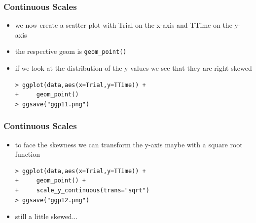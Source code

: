 \documentclass[xcolor={table},c]{beamer}
\begin{document}
\begin{frame}[fragile]\frametitle{Continuous Scales}
  \begin{itemize}
  \item we now create a scatter plot with Trial on the x-axis and TTime on the y-axis
  \item the respective geom is \texttt{geom\_point()}
  \item if we look at the distribution of the y values we see that they are right skewed
\begin{verbatim}
> ggplot(data,aes(x=Trial,y=TTime)) +
+     geom_point()
> ggsave("ggp11.png")
\end{verbatim}
  \end{itemize}
\begin{center}
\end{center}
\end{frame}


\begin{frame}[fragile]\frametitle{Continuous Scales}
  \begin{itemize}
  \item to face the skewness we can transform the y-axis maybe with a square root function
\begin{verbatim}
> ggplot(data,aes(x=Trial,y=TTime)) +
+     geom_point() +
+     scale_y_continuous(trans="sqrt")
> ggsave("ggp12.png")
\end{verbatim}
\begin{center}
\end{center}
\item still a little skewed...
  \end{itemize}

\end{frame}
\end{document}
